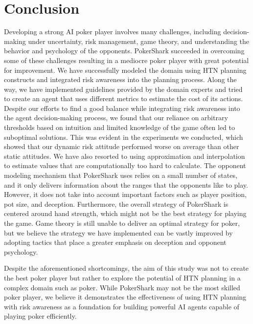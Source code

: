 \section{Conclusion}
Developing a strong AI poker player involves many challenges, including decision-making under uncertainty, risk management, game theory, and understanding the behavior and psychology of the opponents. PokerShark succeeded in overcoming some of these challenges resulting in a mediocre poker player with great potential for improvement.
We have successfully modeled the domain using HTN planning constructs and integrated risk awareness into the planning process. Along the way, we have implemented guidelines provided by the domain experts and tried to create an agent that uses different metrics to estimate the cost of its actions. Despite our efforts to find a good balance while integrating risk awareness into the agent decision-making process, we found that our reliance on arbitrary thresholds based on intuition and limited knowledge of the game often led to suboptimal solutions. This was evident in the experiments we conducted, which showed that our dynamic risk attitude performed worse on average than other static attitudes. We have also resorted to using approximation and interpolation to estimate values that are computationally too hard to calculate. The opponent modeling mechanism that PokerShark uses relies on a small number of states, and it only delivers information about the ranges that the opponents like to play. However, it does not take into account important factors such as player position, pot size, and deception. Furthermore, the overall strategy of PokerShark is centered around hand strength, which might not be the best strategy for playing the game. Game theory is still unable to deliver an optimal strategy for poker, but we believe the strategy we have implemented can be vastly improved by adopting tactics that place a greater emphasis on deception and opponent psychology.

Despite the aforementioned shortcomings, the aim of this study was not to create the best poker player but rather to explore the potential of HTN planning in a complex domain such as poker. While PokerShark may not be the most skilled poker player, we believe it demonstrates the effectiveness of using HTN planning with risk awareness as a foundation for building powerful AI agents capable of playing poker efficiently.
